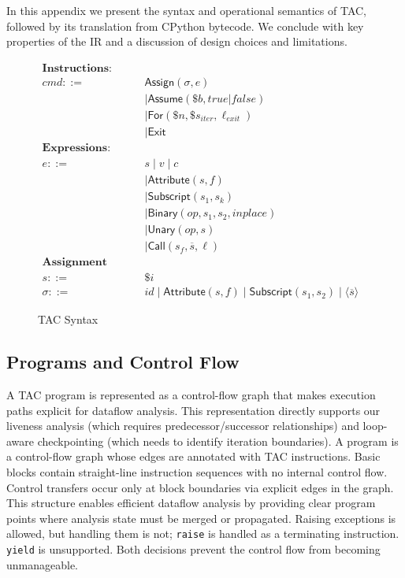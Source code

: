 In this appendix we present the syntax and operational semantics of TAC, followed by its translation from CPython bytecode.  
We conclude with key properties of the IR and a discussion of design choices and limitations.


\begin{figure}[t]
\centering
\[
\begin{aligned}
\textbf{Instructions:} && \\
cmd ::= \;& \mathsf{Assign}(\sigma, e) \\
      &\mid \mathsf{Assume}(\$b, true|false) \\
      &\mid \mathsf{For}(\$n, \$s_{\mathit{iter}}, \ell_{\mathit{exit}}) \\
      &\mid \mathsf{Exit} \\[1ex]
\textbf{Expressions:} && \\
e ::= \;& s \mid v \mid c \\
 &\mid \mathsf{Attribute}(s, f) \\
 &\mid \mathsf{Subscript}(s_1, s_k) \\
 &\mid \mathsf{Binary}(op, s_1, s_2, inplace) \\
 &\mid \mathsf{Unary}(op, s) \\
 &\mid \mathsf{Call}(s_f, \overline{s}, \ell) \\[1ex]
\textbf{Assignment Targets:} && \\
s ::= \;& \mathsf{\$}i \\
\sigma ::= \;& id \mid \mathsf{Attribute}(s,f) \mid \mathsf{Subscript}(s_1,s_2) \mid \langle\overline{s}\rangle
\end{aligned}
\]
\caption{TAC Syntax}
\label{fig:tac-syntax}
\end{figure}

\subsection{Programs and Control Flow}

A TAC program is represented as a control-flow graph that makes execution paths explicit for dataflow analysis. This representation directly supports our liveness analysis (which requires predecessor/successor relationships) and loop-aware checkpointing (which needs to identify iteration boundaries).
A program is a control-flow graph whose edges are annotated with TAC instructions.
Basic blocks contain straight-line instruction sequences with no internal control flow. Control transfers occur only at block boundaries via explicit edges in the graph. This structure enables efficient dataflow analysis by providing clear program points where analysis state must be merged or propagated.
Raising exceptions is allowed, but handling them is not; \texttt{raise} is handled as a terminating instruction. \texttt{yield} is unsupported. Both decisions prevent the control flow from becoming unmanageable. 

